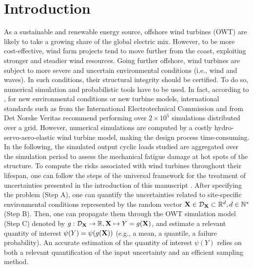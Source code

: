 \section{Introduction}
As a sustainable and renewable energy source, offshore wind turbines (OWT) are likely to take a growing share of the global electric mix. 
However, to be more cost-effective, wind farm projects tend to move further from the coast, exploiting stronger and steadier wind resources. 
Going further offshore, wind turbines are subject to more severe and uncertain environmental conditions (i.e., wind and waves). 
In such conditions, their structural integrity should be certified. 
To do so, numerical simulation and probabilistic tools have to be used. 
In fact, according to \citet{graf_2016}, for new environmental conditions or new turbine models, international standards such as \citet{iec_2019} from the International Electrotechnical Commission and \citet{dnv_loads_2016} from Det Norske Veritas recommend performing over $2 \times 10^5$ simulations distributed over a grid. 
However, numerical simulations are computed by a costly hydro-servo-aero-elastic wind turbine model, making the design process time-consuming. 
In the following, the simulated output cyclic loads studied are aggregated over the simulation period to assess the mechanical fatigue damage at hot spots of the structure. 
To compute the risks associated with wind turbines throughout their lifespan, one can follow the steps of the universal framework for the treatment of uncertainties presented in the introduction of this manuscript . 
After specifying the problem (Step A), one can quantify the uncertainties related to site-specific environmental conditions represented by the random vector ${\bf X} \in \mathcal{D}_{{\bf X}} \subset \mathbb{R}^d, d\in \mathbb{N}^{*}$ (Step B). 
Then, one can propagate them through the OWT simulation model (Step C) denoted by $g: \mathcal{D}_{{\bf X}}\rightarrow \mathbb{R}, {\bf X} \mapsto Y = g({\bf X})$, and estimate a relevant quantity of interest $\psi(Y) = \psi(g({\bf X}))$ (e.g., a mean, a quantile, a failure probability). 
An accurate estimation of the quantity of interest $\psi(Y)$ relies on both a relevant quantification of the input uncertainty and an efficient sampling method.

